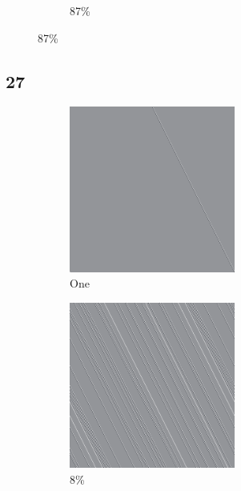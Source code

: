 \documentclass[12pt, fleqn]{report}                             %
\theoremstyle{break}                                            %
\begin{document}
\begin{figure}[ht!]
\begin{subfigure}[b]{0.4\linewidth}
          \caption{87\%}
        \end{subfigure}
      \end{figure}


      \clearpage
      \subsection{27}
      \begin{figure}[ht!]
        \centering
        \begin{subfigure}[b]{0.4\linewidth}
          \includegraphics[width=0.6\textwidth]{Images/27/a.png}
          \caption{One}
        \end{subfigure}
        \begin{subfigure}[b]{0.4\linewidth}
          \includegraphics[width=0.6\textwidth]{Images/27/b.png}
          \caption{8\%}
        \end{subfigure}
        \begin{subfigure}[b]{0.4\linewidth}

\end{subfigure}
\end{figure}
\end{document}
